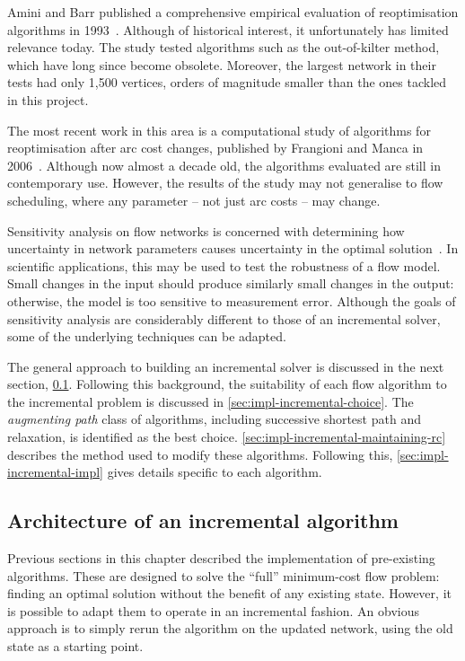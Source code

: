 Amini and Barr published a comprehensive empirical evaluation of reoptimisation algorithms in 1993~\cite{Amini:1993}. Although of historical interest, it unfortunately has limited relevance today. The study tested algorithms such as the out-of-kilter method, which have long since become obsolete. Moreover, the largest network in their tests had only 1,500 vertices, orders of magnitude smaller than the ones tackled in this project. 

The most recent work in this area is a computational study of algorithms for reoptimisation after arc cost changes, published by Frangioni and Manca in 2006~\cite{Frangioni:2006}. Although now almost a decade old, the algorithms evaluated are still in contemporary use. However, the results of the study may not generalise to flow scheduling, where any parameter -- not just arc costs -- may change. 

Sensitivity analysis on flow networks is concerned with determining how uncertainty in network parameters causes uncertainty in the optimal solution~\cite[\S9.11]{Ahuja:1993}. In scientific applications, this may be used to test the robustness of a flow model. Small changes in the input should produce similarly small changes in the output: otherwise, the model is too sensitive to measurement error. Although the goals of sensitivity analysis are considerably different to those of an incremental solver, some of the underlying techniques can be adapted.

The general approach to building an incremental solver is discussed in the next section, \cref{sec:impl-incremental-architecture}. Following this background, the suitability of each flow algorithm to the incremental problem is discussed in \cref{sec:impl-incremental-choice}. The \emph{augmenting path} class of algorithms, including successive shortest path and relaxation, is identified as the best choice. \cref{sec:impl-incremental-maintaining-rc} describes the method used to modify these algorithms. Following this, \cref{sec:impl-incremental-impl} gives details specific to each algorithm.

\subsection{Architecture of an incremental algorithm} \label{sec:impl-incremental-architecture}

Previous sections in this chapter described the implementation of pre-existing algorithms. These are designed to solve the ``full'' minimum-cost flow problem: finding an optimal solution without the benefit of any existing state. However, it is possible to adapt them to operate in an incremental fashion. An obvious approach is to simply rerun the algorithm on the updated network, using the old state as a starting point.


